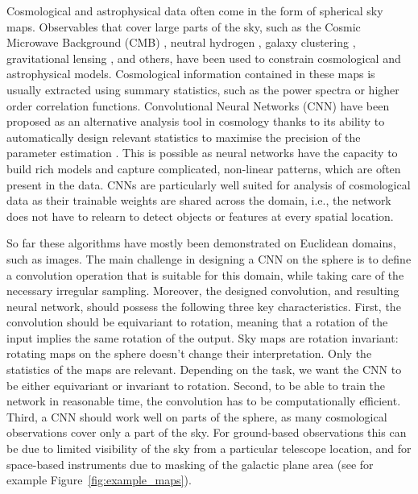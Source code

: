 \documentclass[final,twocolumn,3p,times,sort&compress]{elsarticle}
\newcommand{\figref}[1]{Figure~\ref{fig:#1}}
\newcommand{\1}{\b{1}}              %
\newcommand{\0}{\b{0}}              %
\begin{document}
Cosmological and astrophysical data often come in the form of spherical sky maps.
Observables that cover large parts of the sky, such as the Cosmic Microwave Background (CMB) \citep{planck2015cosmologicalparameters,komatsu2011sevenyear,staggs2018recentdiscoveries}, neutral hydrogen \citep{santos2015cosmologySKA,HI4PI2016fullskyHI}, galaxy clustering \citep{alam2017clusteringgalaxies}, gravitational lensing \citep{troxel2017darkenergy,hildebrandt2017kidscosmological}, and others, have been used to constrain cosmological and astrophysical models.
Cosmological information contained in these maps is usually extracted using summary statistics, such as the power spectra or higher order correlation functions.
Convolutional Neural Networks (CNN) have been proposed as an alternative analysis tool in cosmology thanks to its ability to automatically design relevant statistics to maximise the precision of the parameter estimation
\citep{schmelze2017cosmologicalmodel,luciesmith2018machinelearning,gupta2018nongaussianinformation,gillet2018deeplearning,hassan2018reionizationmodels,aragoncalvo2018classyfyinglarge,ciuca2017cnnstring,ravanbakhsh2017estimating}.
This is possible as neural networks have the capacity to build rich models and capture complicated, non-linear patterns, which are often present in the data.
CNNs are particularly well suited for analysis of cosmological data as their trainable weights are shared across the domain, i.e., the network does not have to relearn to detect objects or features at every spatial location.

So far these algorithms have mostly been demonstrated on Euclidean domains, such as images.
The main challenge in designing a CNN on the sphere is to define a convolution operation that is suitable for this domain, while taking care of the necessary irregular sampling.
Moreover, the designed convolution, and resulting neural network, should possess the following three key characteristics.
First, the convolution should be equivariant to rotation, meaning that a rotation of the input implies the same rotation of the output.
Sky maps are rotation invariant: rotating maps on the sphere doesn't change their interpretation.
Only the statistics of the maps are relevant.
Depending on the task, we want the CNN to be either equivariant or invariant to rotation.
Second, to be able to train the network in reasonable time, the convolution has to be computationally efficient.
Third, a CNN should work well on parts of the sphere, as many cosmological observations cover only a part of the sky.
For ground-based observations this can be due to limited visibility of the sky from a particular telescope location, and for space-based instruments due to masking of the galactic plane area (see for example \figref{example_maps}).
\end{document}
